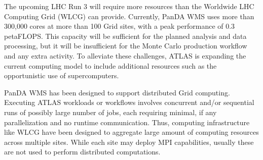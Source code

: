 The upcoming LHC Run 3 will require more resources than the Worldwide LHC
Computing Grid (WLCG) can provide. Currently, PanDA WMS uses more than
300,000 cores at more than 100 Grid sites, with a peak performance of 0.3
petaFLOPS\@. This capacity will be sufficient for the planned analysis and
data processing, but it will be insufficient for the Monte Carlo production
workflow and any extra activity. To alleviate these challenges, ATLAS is
expanding the current computing model to include additional resources such as
the opportunistic use of supercomputers.


PanDA WMS has been designed to support distributed Grid computing. Executing
ATLAS workloads or workflows involves concurrent and/or sequential runs of
possibly large number of jobs, each requiring minimal, if any parallelization
and no runtime communication. Thus, computing infrastructure like WLCG have
been designed to aggregate large amount of computing resources across
multiple sites. While each site may deploy MPI capabilities, usually these
are not used to perform distributed computations.

